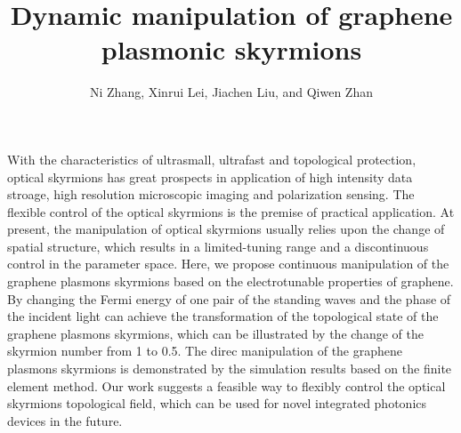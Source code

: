 \documentclass{optica-article}
\begin{document}
\title{Dynamic manipulation of graphene plasmonic skyrmions}

\author{Ni Zhang, Xinrui Lei, Jiachen Liu, and Qiwen Zhan}

\address{School of Optical-Electrical and Computer Engineering, University of Shanghai for Science and Technology, Shanghai 200093, China\\
Zhangjiang Laboratory, Chinese Academy of Sciences (CAS), 100 Haike Road, Shanghai 201204, China\\
}



\begin{abstract*} 
With the characteristics of ultrasmall, ultrafast and topological protection, optical skyrmions has great prospects in application of high intensity data stroage, high resolution microscopic imaging and polarization sensing. The flexible control of the optical skyrmions is the premise of practical application. At present, the manipulation of optical skyrmions usually relies upon the change of spatial structure, which results in a limited-tuning range and a discontinuous control in the parameter space. Here, we propose continuous manipulation of the graphene plasmons skyrmions based on the electrotunable properties of graphene. By changing the Fermi energy of one pair of the standing waves and the phase of the incident light can achieve the transformation of the topological state of the graphene plasmons skyrmions, which can be illustrated by the change of the skyrmion number from 1 to 0.5. The direc manipulation of the graphene plasmons skyrmions is demonstrated by the simulation results based on the finite element method. Our work suggests a feasible way to flexibly control the optical skyrmions topological field, which can be used for novel integrated photonics devices in the future.

\end{abstract*}

\end{document}
